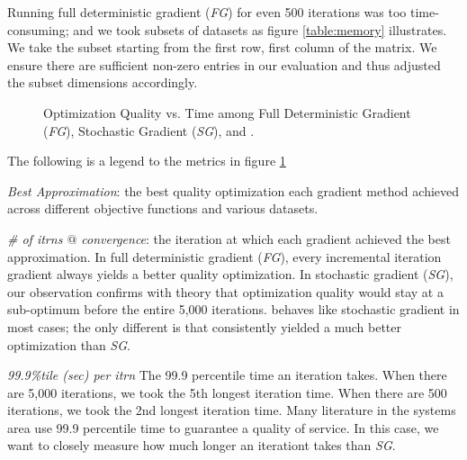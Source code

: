 Running full deterministic gradient (\emph{FG}) for even 500 iterations was too time-consuming; 
and we took subsets of datasets as figure \ref{table:memory} illustrates.
We take the subset starting from the first row, first column of the matrix.
We ensure there are sufficient non-zero entries in our evaluation and thus adjusted the subset dimensions accordingly.

\begin{figure}
\centerline{}
\caption[Optimization Quality among gradient methods]{Optimization Quality vs. Time among Full Deterministic Gradient (\emph{FG}), Stochastic Gradient (\emph{SG}), and \tool.}
\label{table:approx}
\end{figure}


The following is a legend to the metrics in figure \ref{table:approx}
\begin{sloppy}
\begin{compactenum}
\item \emph{Best Approximation}: 
the best quality optimization each gradient method achieved across different objective functions and various datasets.  
\item \emph{\# of itrns $@$ convergence}: 
the iteration at which each gradient achieved the best approximation.  
In full deterministic gradient (\emph{FG}), every incremental iteration gradient always yields a better quality optimization. 
In stochastic gradient (\emph{SG}), our observation confirms with theory that optimization quality would stay at a sub-optimum before the entire 5,000 iterations.
\tool behaves like stochastic gradient in most cases; the only different is that \tool consistently yielded a much better optimization than \emph{SG}.
\item \emph{99.9\%tile (sec) per itrn}
The 99.9 percentile time an iteration takes.  
When there are 5,000 iterations, we took the 5th longest iteration time.  
When there are 500 iterations, we took the 2nd longest iteration time.
Many literature in the systems area use 99.9 percentile time to guarantee a quality of service.  
In this case, we want to closely measure how much longer an iterationt \tool takes than \emph{SG}.
\end{compactenum}
\end{sloppy}

